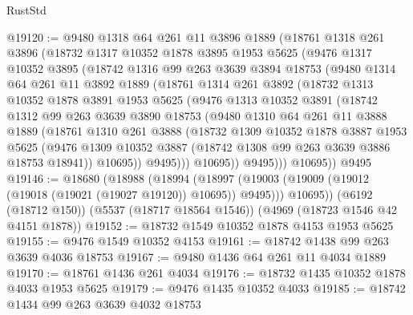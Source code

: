 \begin{lexlean}{RustStd}
\begin{coremodule}
@19120 := @9480
    @1318
    @64
    @261
    @11
    @3896
    @1889
    (@18761
      @1318
      @261
      @3896
      (@18732
        @1317
        @10352
        @1878
        @3895
        @1953
        @5625
        (@9476
          @1317
          @10352
          @3895
          (@18742
            @1316
            @99
            @263
            @3639
            @3894
            @18753
            (@9480
              @1314
              @64
              @261
              @11
              @3892
              @1889
              (@18761
                @1314
                @261
                @3892
                (@18732
                  @1313
                  @10352
                  @1878
                  @3891
                  @1953
                  @5625
                  (@9476
                    @1313
                    @10352
                    @3891
                    (@18742
                      @1312
                      @99
                      @263
                      @3639
                      @3890
                      @18753
                      (@9480
                        @1310
                        @64
                        @261
                        @11
                        @3888
                        @1889
                        (@18761
                          @1310
                          @261
                          @3888
                          (@18732
                            @1309
                            @10352
                            @1878
                            @3887
                            @1953
                            @5625
                            (@9476
                              @1309
                              @10352
                              @3887
                              (@18742 @1308 @99 @263 @3639 @3886 @18753 @18941))
                            @10695))
                        @9495)))
                  @10695))
              @9495)))
        @10695))
    @9495
@19146 := @18680
    (@18988
      (@18994
        (@18997 (@19003 (@19009 (@19012 (@19018 (@19021 (@19027 @19120)) @10695)) @9495)))
        @10695))
    (@6192 (@18712 @150))
    (@5537 (@18717 @18564 @1546))
    (@4969 (@18723 @1546 @42 @4151 @1878))
@19152 := @18732 @1549 @10352 @1878 @4153 @1953 @5625
@19155 := @9476 @1549 @10352 @4153
@19161 := @18742 @1438 @99 @263 @3639 @4036 @18753
@19167 := @9480 @1436 @64 @261 @11 @4034 @1889
@19170 := @18761 @1436 @261 @4034
@19176 := @18732 @1435 @10352 @1878 @4033 @1953 @5625
@19179 := @9476 @1435 @10352 @4033
@19185 := @18742 @1434 @99 @263 @3639 @4032 @18753

\end{coremodule}
\end{lexlean}
